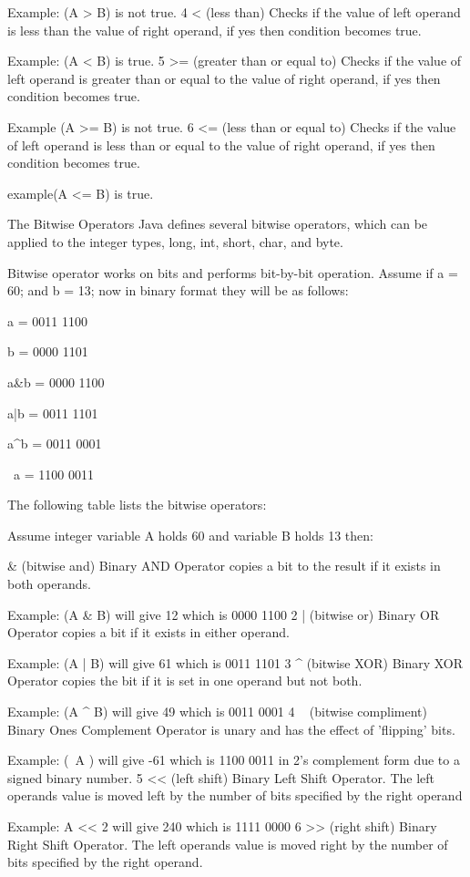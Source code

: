 Example: (A > B) is not true. 4 < (less than) Checks if the value of left operand is less than the value of right operand, if yes then condition becomes true.

Example: (A < B) is true. 5 >= (greater than or equal to) Checks if the value of left operand is greater than or equal to the value of right operand, if yes then condition becomes true.

Example (A >= B) is not true. 6 <= (less than or equal to) Checks if the value of left operand is less than or equal to the value of right operand, if yes then condition becomes true.

example(A <= B) is true.

The Bitwise Operators
Java defines several bitwise operators, which can be applied to the integer types, long, int, short, char, and byte.

Bitwise operator works on bits and performs bit-by-bit operation. Assume if a = 60; and b = 13; now in binary format they will be as follows:

a = 0011 1100

b = 0000 1101

a&b = 0000 1100

a|b = 0011 1101

a^b = 0011 0001

~a = 1100 0011

The following table lists the bitwise operators:

Assume integer variable A holds 60 and variable B holds 13 then:

& (bitwise and) Binary AND Operator copies a bit to the result if it exists in both operands.

Example: (A & B) will give 12 which is 0000 1100 2 | (bitwise or) Binary OR Operator copies a bit if it exists in either operand.

Example: (A | B) will give 61 which is 0011 1101 3 ^ (bitwise XOR) Binary XOR Operator copies the bit if it is set in one operand but not both.

Example: (A ^ B) will give 49 which is 0011 0001 4 ~ (bitwise compliment) Binary Ones Complement Operator is unary and has the effect of 'flipping' bits.

Example: (~A ) will give -61 which is 1100 0011 in 2's complement form due to a signed binary number. 5 << (left shift) Binary Left Shift Operator. The left operands value is moved left by the number of bits specified by the right operand

Example: A << 2 will give 240 which is 1111 0000 6 >> (right shift) Binary Right Shift Operator. The left operands value is moved right by the number of bits specified by the right operand.

